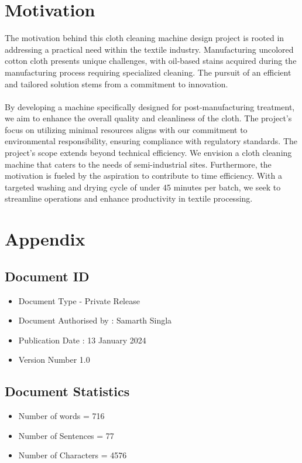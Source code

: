 \documentclass[12pt]{article}
\begin{document}
\section{Motivation}
The motivation behind this cloth cleaning machine design project is rooted in addressing a practical need within the textile industry. Manufacturing uncolored cotton cloth presents unique challenges, with oil-based stains acquired during the manufacturing process requiring specialized cleaning. The pursuit of an efficient and tailored solution stems from a commitment to innovation. \\ \\By developing a machine specifically designed for post-manufacturing treatment, we aim to enhance the overall quality and cleanliness of the cloth. The project's focus on utilizing minimal resources aligns with our commitment to environmental responsibility, ensuring compliance with regulatory standards. The project's scope extends beyond technical efficiency. We envision a cloth cleaning machine that caters to the needs of semi-industrial sites. Furthermore, the motivation is fueled by the aspiration to contribute to time efficiency. With a targeted washing and drying cycle of under 45 minutes per batch, we seek to streamline operations and enhance productivity in textile processing.


\newpage
\appendix
\section{Appendix}
\subsection{Document ID}
\begin{itemize}
    \item Document Type - Private Release
    \item Document Authorised by : Samarth Singla
    \item Publication Date : 13 January 2024
    \item Version Number 1.0
\end{itemize}
\subsection{Document Statistics}
\begin{itemize}
    \item Number of words = 716
    \item Number of Sentences = 77
    \item Number of Characters = 4576
\end{itemize}
\end{document}
